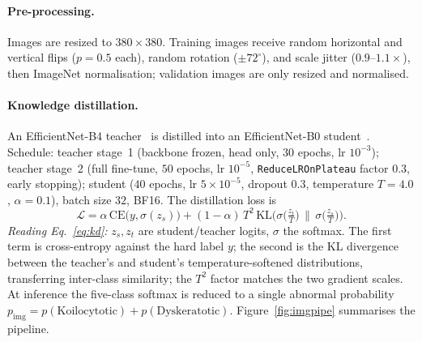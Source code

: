 \documentclass[sigplan,nonacm,screen]{acmart}
\begin{document}
\paragraph{Pre-processing.} Images are resized to $380\times380$. Training images receive random horizontal
and vertical flips ($p=0.5$ each), random rotation ($\pm72^{\circ}$), and scale jitter ($0.9$--$1.1\times$),
then ImageNet normalisation; validation images are only resized and normalised.

\paragraph{Knowledge distillation.} An EfficientNet-B4 teacher~\cite{tan2019efficientnet} is distilled into an
EfficientNet-B0 student~\cite{hinton2015}. Schedule: teacher stage~1 (backbone frozen, head only, $30$ epochs,
lr $10^{-3}$); teacher stage~2 (full fine-tune, $50$ epochs, lr $10^{-5}$, \texttt{ReduceLROnPlateau} factor
$0.3$, early stopping); student ($40$ epochs, lr $5\times10^{-5}$, dropout $0.3$, temperature $T=4.0$,
$\alpha=0.1$), batch size $32$, BF16. The distillation loss is
\begin{equation}\label{eq:kd}
\mathcal{L}=\alpha\,\mathrm{CE}\!\big(y,\sigma(z_s)\big)+(1-\alpha)\,T^2\,\mathrm{KL}\!\Big(\sigma\!\big(\tfrac{z_t}{T}\big)\,\big\|\,\sigma\!\big(\tfrac{z_s}{T}\big)\Big).
\end{equation}
\emph{Reading Eq.~\eqref{eq:kd}:} $z_s,z_t$ are student/teacher logits, $\sigma$ the softmax. The first term
is cross-entropy against the hard label $y$; the second is the KL divergence between the teacher's and
student's temperature-softened distributions, transferring inter-class similarity; the $T^2$ factor matches
the two gradient scales. At inference the five-class softmax is reduced to a single abnormal probability
$p_{\mathrm{img}}=p(\text{Koilocytotic})+p(\text{Dyskeratotic})$. Figure~\ref{fig:imgpipe} summarises the
pipeline.
\end{document}
